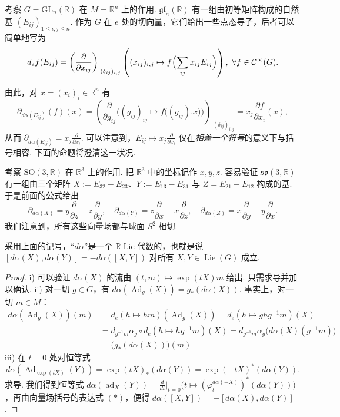 \begin{example*}
考察 $G=\mathrm{GL}_{n}(\mathbb R)$ 在 $M=\mathbb R^{n}$ 上的作用. $\mathfrak{gl}_{n}(\mathbb R)$ 有一组由初等矩阵构成的自然基 $(E_{ij})_{1\leqslant i,j\leqslant n}$. 作为 $G$ 在 $e$ 处的切向量，它们给出一些点态导子，后者可以简单地写为
\[
d_{e}f(E_{ij})=\left(\frac{\partial}{\partial x_{ij}}\right)_{|(\delta_{ij})_{i,j}}\left((x_{ij})_{i,j}\mapsto f\Bigl(\sum_{ij}x_{ij}E_{ij}\Bigr)\right),\ \forall f\in\mathcal C^{\infty}(G).
\]
\end{example*}

由此，对 $x=(x_{i})_{i}\in\mathbb R^{n}$ 有
\[
\partial_{d\alpha(E_{ij})}(f)(x)=\left(\frac{\partial}{\partial g_{ij}}\bigl((g_{ij})_{ij}\mapsto f\bigl((g_{ij}).x\bigr)\bigr)\right)_{|(\delta_{ij})_{i,j}}=x_{j}\frac{\partial f}{\partial x_{i}}(x),
\]
从而 $\partial_{d\alpha(E_{ij})}=x_{j}\frac{\partial}{\partial x_{i}}$. 可以注意到，$E_{ij}\mapsto x_{j}\frac{\partial}{\partial x_{i}}$ 仅在\emph{相差一个符号}的意义下与括号相容. 下面的命题将澄清这一状况.

\begin{example*}
考察 $\mathrm{SO}(3,\mathbb R)$ 在 $\mathbb R^{3}$ 上的作用. 把 $\mathbb R^{3}$ 中的坐标记作 $x,y,z$. 容易验证 $\mathfrak{so}(3,\mathbb R)$ 有一组由三个矩阵 $X:=E_{32}-E_{23}$、$Y:=E_{13}-E_{31}$ 与 $Z=E_{21}-E_{12}$ 构成的基. 于是前面的公式给出
\[
\partial_{d\alpha(X)}=y\frac{\partial}{\partial z}-z\frac{\partial}{\partial y},\quad \partial_{d\alpha(Y)}=z\frac{\partial}{\partial x}-x\frac{\partial}{\partial z},\quad \partial_{d\alpha(Z)}=x\frac{\partial}{\partial y}-y\frac{\partial}{\partial x}.
\]
我们注意到，所有这些向量场都与球面 $S^{2}$ 相切.
\end{example*}

\begin{proposition*}
采用上面的记号，``$d\alpha$''是一个 $\mathbb R$-Lie 代数的，也就是说 $[d\alpha(X),d\alpha(Y)]=-d\alpha([X,Y])$ 对所有 $X,Y\in\operatorname{Lie}(G)$ 成立.
\end{proposition*}

\begin{proof}
i) 可以验证 $d\alpha(X)$ 的流由 $(t,m)\mapsto\exp(tX)m$ 给出. 只需求导并加以确认.
ii) 对一切 $g\in G$，有 $d\alpha(\operatorname{Ad}_{g}(X))=g_{*}(d\alpha(X))$. 事实上，对一切 $m\in M$：
\begin{align*}
d\alpha(\operatorname{Ad}_{g}(X))(m) &= d_{e}(h\mapsto hm)(\operatorname{Ad}_{g}(X))=d_{e}(h\mapsto ghg^{-1}m)(X)\\
&= d_{g^{-1}m}\alpha_{g}\circ d_{e}(h\mapsto hg^{-1}m)(X)=d_{g^{-1}m}\alpha_{g}\bigl(d\alpha(X)(g^{-1}m)\bigr)\\
&= \bigl(g_{*}(d\alpha(X))\bigr)(m)
\end{align*}
iii) 在 $t=0$ 处对恒等式
\[
d\alpha(\operatorname{Ad}_{\exp(tX)}(Y))=\exp(tX)_{*}(d\alpha(Y))=\exp(-tX)^{*}(d\alpha(Y)).
\]
求导. 我们得到恒等式 $d\alpha(\operatorname{ad}_{X}(Y))=\frac{d}{dt}\bigr|_{t=0}\bigl(t\mapsto(\varphi^{d\alpha(-X)}_{t})^{*}(d\alpha(Y))\bigr)$，再由向量场括号的表达式 $(*)$，便得 $d\alpha([X,Y])=-[d\alpha(X),d\alpha(Y)]$.
\end{proof}

